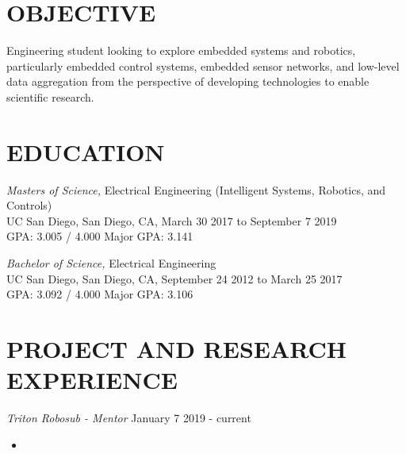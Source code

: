\documentclass[line,margin]{res}
\begin{document}
\address{13336 Tobiasson Rd, Poway, CA 92064}
\address{nthui@ucsd.edu, (408) 838-5393}


\begin{resume}

\section{OBJECTIVE}
	Engineering student looking to explore embedded systems and robotics, particularly embedded control systems, embedded sensor networks, and low-level data aggregation from the perspective of developing technologies to enable scientific research.

\section{EDUCATION}
	{\sl Masters of Science,} Electrical Engineering (Intelligent Systems, Robotics, and Controls)\\
	UC San Diego, San Diego, CA, March 30 2017 to September 7 2019\\
	GPA: 3.005 / 4.000
	Major GPA: 3.141

	{\sl Bachelor of Science,} Electrical Engineering \\
	UC San Diego, San Diego, CA, September 24 2012 to March 25 2017\\
	GPA: 3.092 / 4.000
	Major GPA: 3.106

\section{PROJECT AND RESEARCH EXPERIENCE}
	{\sl Triton Robosub - Mentor} \hfill January 7 2019 - current
	\begin{itemize}
		\item 
	\end{itemize}


\end{resume}
\end{document}
